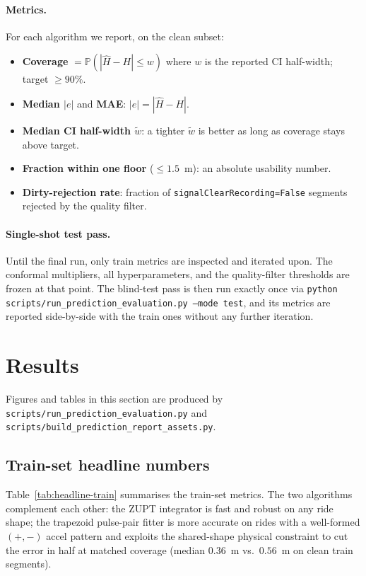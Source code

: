 \paragraph{Metrics.}
For each algorithm we report, on the clean subset:
\begin{itemize}
  \item \textbf{Coverage} $=\mathbb{P}(|\hat{H}-H|\le w)$ where $w$ is
        the reported CI half-width; target $\ge 90\%$.
  \item \textbf{Median $|e|$} and \textbf{MAE}: $|e|=|\hat{H}-H|$.
  \item \textbf{Median CI half-width $\tilde{w}$}: a tighter
        $\tilde{w}$ is better as long as coverage stays above target.
  \item \textbf{Fraction within one floor} ($\le 1.5$~m):
        an absolute usability number.
  \item \textbf{Dirty-rejection rate}: fraction of
        \texttt{signalClearRecording=False} segments rejected by the
        quality filter.
\end{itemize}

\paragraph{Single-shot test pass.} Until the final run, only train
metrics are inspected and iterated upon. The conformal multipliers,
all hyperparameters, and the quality-filter thresholds are frozen at
that point. The blind-test pass is then run exactly once via
\texttt{\small python scripts/\allowbreak{}run\_prediction\_evaluation.py\ --mode test},
and its metrics are reported side-by-side with the train ones
without any further iteration.

\section{Results}
\label{sec:prediction-results}

Figures and tables in this section are produced by
\texttt{scripts/run\_prediction\_evaluation.py} and
\texttt{scripts/build\_prediction\_report\_assets.py}.

\subsection{Train-set headline numbers}

Table~\ref{tab:headline-train} summarises the train-set metrics. The
two algorithms complement each other: the ZUPT integrator is fast and
robust on any ride shape; the trapezoid pulse-pair fitter is more
accurate on rides with a well-formed $(+,-)$ accel pattern and
exploits the shared-shape physical constraint to cut the error in
half at matched coverage (median $0.36$~m vs.\ $0.56$~m on clean train
segments).

